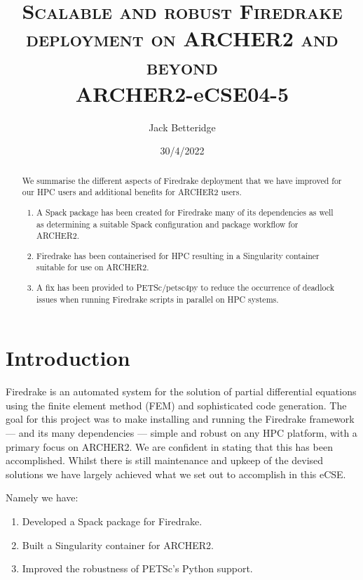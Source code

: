 \documentclass[a4paper,11pt]{article}
\title{\textsc{Scalable and robust Firedrake deployment on ARCHER2 and beyond}\\
\Large ARCHER2-eCSE04-5}
\author{Jack Betteridge}
\date{30/4/2022}
\begin{document}
\maketitle

\begin{abstract}
	We summarise the different aspects of Firedrake deployment that we have improved for our HPC users and additional benefits for ARCHER2 users.
	\begin{enumerate}
	\item A Spack package has been created for Firedrake many of its dependencies as well as determining a suitable Spack configuration and package workflow for ARCHER2.
	\item Firedrake has been containerised for HPC resulting in a Singularity container suitable for use on ARCHER2.
	\item A fix has been provided to PETSc/petsc4py to reduce the occurrence of deadlock issues when running Firedrake scripts in parallel on HPC systems.
\end{enumerate}
\end{abstract}

\section{Introduction}
\label{sec:intro}
Firedrake is an automated system for the solution of partial differential equations using the finite element method (FEM) and sophisticated code generation.
The goal for this project was to make installing and running the Firedrake framework\cite{firedrakeweb,firedrakepaper} --- and its many dependencies --- simple and robust on any HPC platform, with a primary focus on ARCHER2.
We are confident in stating that this has been accomplished.
Whilst there is still maintenance and upkeep of the devised solutions we have largely achieved what we set out to accomplish in this eCSE.

\noindent Namely we have:
\begin{enumerate}[topsep=2pt, partopsep=0pt, itemsep=1pt, parsep=1pt]
    \item Developed a Spack package for Firedrake.
	\item Built a Singularity container for ARCHER2.
	\item Improved the robustness of PETSc's Python support.
\end{enumerate} 
\end{document}
